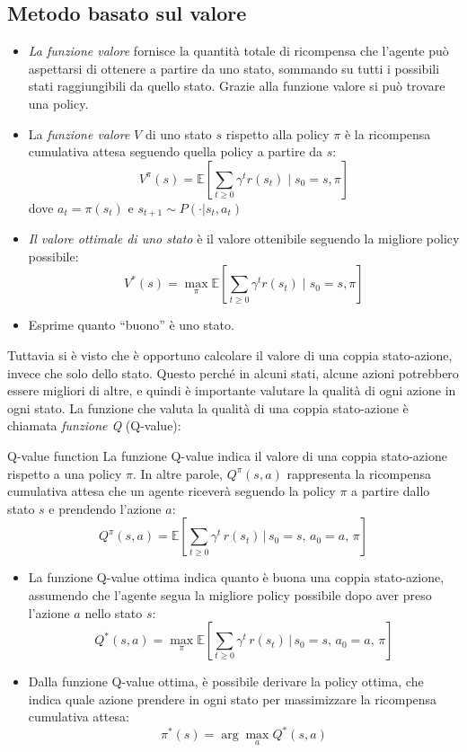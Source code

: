 \subsection{Metodo basato sul valore}
\begin{itemize}
	\item \textit{La funzione valore} fornisce la quantità totale di ricompensa che l'agente può aspettarsi di ottenere a partire da uno stato, sommando su tutti i possibili stati raggiungibili da quello stato. Grazie alla funzione valore si può trovare una policy.
	\item La \textit{funzione valore} $V$ di uno stato $s$ rispetto alla policy $\pi$ è la ricompensa cumulativa attesa seguendo quella policy a partire da $s$:
	      \[
		      V^\pi(s) = \mathbb{E}\left[\sum_{t \geq 0} \gamma^t r(s_t) \;\bigg|\; s_0 = s, \pi \right]
	      \]
	      dove $a_t = \pi(s_t)$ e $s_{t+1} \sim P(\cdot|s_t, a_t)$

	\item \textit{Il valore ottimale di uno stato} è il valore ottenibile seguendo la migliore policy possibile:
	      \[
		      V^*(s) = \max_\pi \mathbb{E}\left[\sum_{t \geq 0} \gamma^t r(s_t) \;\bigg|\; s_0 = s, \pi \right]
	      \]
	\item Esprime quanto “buono” è uno stato.
\end{itemize}
Tuttavia si è visto che è opportuno calcolare il valore di una coppia stato-azione, invece che solo dello stato. Questo perché in alcuni stati, alcune azioni potrebbero essere migliori di altre, e quindi è importante valutare la qualità di ogni azione in ogni stato. La funzione che valuta la qualità di una coppia stato-azione è chiamata \textit{funzione Q} (Q-value):
\begin{definizione}{Q-value function}
	La funzione Q-value indica il valore di una coppia stato-azione rispetto a una policy $\pi$. In altre parole, $Q^\pi(s, a)$ rappresenta la ricompensa cumulativa attesa che un agente riceverà seguendo la policy $\pi$ a partire dallo stato $s$ e prendendo l'azione $a$:
	\[
		Q^\pi(s, a) = \mathbb{E}\left[ \sum_{t \geq 0} \gamma^t\, r(s_t) \,\bigg|\, s_0 = s,\, a_0 = a,\, \pi \right]
	\]
\end{definizione}

\begin{itemize}
	\item La funzione Q-value ottima indica quanto è buona una coppia stato-azione, assumendo che l'agente segua la migliore policy possibile dopo aver preso l'azione $a$ nello stato $s$:
	      \[
		      Q^*(s, a) = \max_\pi \mathbb{E}\left[ \sum_{t \geq 0} \gamma^t\, r(s_t) \,\bigg|\, s_0 = s,\, a_0 = a,\, \pi \right]
	      \]

	\item Dalla funzione Q-value ottima, è possibile derivare la policy ottima, che indica quale azione prendere in ogni stato per massimizzare la ricompensa cumulativa attesa:
	      \[
		      \pi^*(s) = \arg\max_a Q^*(s, a)
	      \]
\end{itemize}

